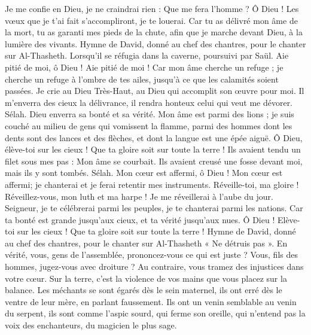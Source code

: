 \begin{multicols}{2}
Je me confie en Dieu, je ne craindrai rien : Que me fera l'homme ?
Ô Dieu ! Les vœux que je t'ai fait s'accompliront, je te louerai.
Car tu as délivré mon âme de la mort, tu as garanti mes pieds de la chute, afin que je marche devant Dieu, à la lumière des vivants.
\VerseOne{}Hymne de David, donné au chef des chantres, pour le chanter sur Al-Thasheth. Lorsqu'il se réfugia dans la caverne, poursuivi par Saül.
Aie pitié de moi, ô Dieu ! Aie pitié de moi ! Car mon âme cherche un refuge ; je cherche un refuge à l'ombre de tes ailes, jusqu'à ce que les calamités soient passées.
Je crie au Dieu Très-Haut, au Dieu qui accomplit son œuvre pour moi.
Il m'enverra des cieux la délivrance, il rendra honteux celui qui veut me dévorer. Sélah. Dieu enverra sa bonté et sa vérité.
Mon âme est parmi des lions ; je suis couché au milieu de gens qui vomissent la flamme, parmi des hommes dont les dents sont des lances et des flèches, et dont la langue est une épée aiguë.
Ô Dieu, élève-toi sur les cieux ! Que ta gloire soit sur toute la terre !
Ils avaient tendu un filet sous mes pas : Mon âme se courbait. Ils avaient creusé une fosse devant moi, mais ils y sont tombés. Sélah.
Mon cœur est affermi, ô Dieu ! Mon cœur est affermi; je chanterai et je ferai retentir mes instruments.
Réveille-toi, ma gloire ! Réveillez-vous, mon luth et ma harpe ! Je me réveillerai à l'aube du jour.
Seigneur, je te célébrerai parmi les peuples, je te chanterai parmi les nations.
Car ta bonté est grande jusqu'aux cieux, et ta vérité jusqu'aux nues.
Ô Dieu ! Elève-toi sur les cieux ! Que ta gloire soit sur toute la terre !
\VerseOne{}Hymne de David, donné au chef des chantres, pour le chanter sur Al-Thasheth « Ne détruis pas ».
En vérité, vous, gens de l'assemblée, prononcez-vous ce qui est juste ? Vous, fils des hommes, jugez-vous avec droiture ?
Au contraire, vous tramez des injustices dans votre cœur. Sur la terre, c'est la violence de vos mains que vous placez sur la balance.
Les méchants se sont égarés dès le sein maternel, ils ont erré dès le ventre de leur mère, en parlant faussement.
Ils ont un venin semblable au venin du serpent, ils sont comme l'aspic sourd, qui ferme son oreille,
qui n'entend pas la voix des enchanteurs, du magicien le plus sage.

\end{multicols}
